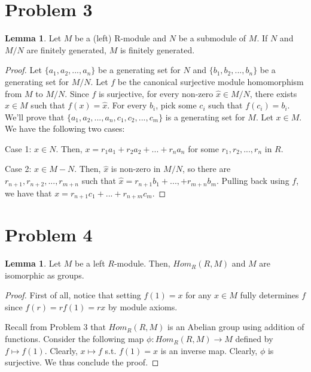 \documentclass{article}
\theoremstyle{definition}
\newtheorem{lemma}[theorem]{Lemma}
\begin{document}
\section{Problem 3}

\begin{lemma}
    Let $M$ be a (left) R-module and $N$ be a submodule of $M$. If $N$ and $M/N$ are finitely generated, $M$ is finitely generated.
\end{lemma}
\begin{proof}
    Let $\{a_{1}, a_{2}, ..., a_{n}\}$ be a generating set for $N$ and $\{b_{1}, b_{2}, ..., b_{n}\}$ be a generating set for $M/N$. Let $f$ be the canonical surjective module homomorphism from $M$ to $M/N$. Since $f$ is surjective, for every non-zero $\hat{x} \in M/N$, there exists $x \in M$ such that $f(x) = \hat{x}$. For every $b_{i}$, pick some $c_{i}$ such that $f(c_{i}) = b_{i}$. We'll prove that $\{a_{1},a_{2},...,a_{n},c_{1},c_{2},...,c_{m}\}$ is a generating set for $M$. Let $x \in M$. We have the following two cases:

    Case 1: $x \in N$.
    Then, $x = r_{1}a_{1} + r_{2}a_{2} + ... + r_{n}a_{n}$ for some $r_{1},r_{2}, ..., r_{n}$ in $R$.

    Case 2: $x \in M - N$.
    Then, $\hat{x}$ is non-zero in $M/N$, so there are $r_{n+1}, r_{n+2}, ..., r_{m+n}$ such that $\hat{x} = r_{n+1}b_{1} + ... , + r_{m+n}b_{m}$. Pulling back using $f$, we have that $x = r_{n+1}c_{1} + ... + r_{n + m}c_{m}$.
\end{proof}

\section{Problem 4}

\begin{lemma}
    Let $M$ be a left $R$-module. Then, $Hom_{R}(R,M)$ and $M$ are isomorphic as groups.
\end{lemma}
\begin{proof}
    First of all, notice that setting $f(1) = x$ for any $x \in M$ fully determines $f$ since $f(r) = rf(1) = rx$ by module axioms.


    Recall from Problem 3 that $Hom_{R}(R,M)$ is an Abelian group using addition of functions. Consider the following map $\phi:Hom_{R}(R,M) \xrightarrow{} M$ defined by $f \mapsto f(1)$. Clearly, $x \mapsto f$ s.t. $f(1) = x$ is an inverse map. Clearly, $\phi$ is surjective. We thus conclude the proof.
\end{proof}
\end{document}
